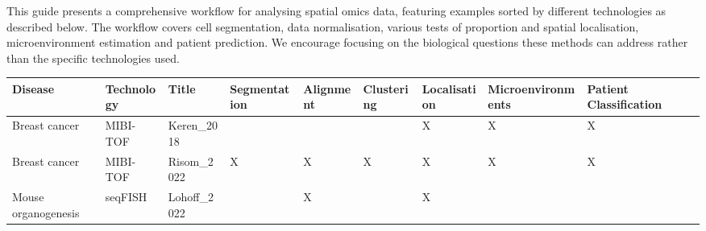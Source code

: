 \documentclass[
  letterpaper,
  DIV=11,
  numbers=noendperiod]{scrreprt}
\begin{document}
This guide presents a comprehensive workflow for analysing spatial omics
data, featuring examples sorted by different technologies as described
below. The workflow covers cell segmentation, data normalisation,
various tests of proportion and spatial localisation, microenvironment
estimation and patient prediction. We encourage focusing on the
biological questions these methods can address rather than the specific
technologies used.

\begin{longtable}[]{@{}
  >{\centering\arraybackslash}p{}
  >{\centering\arraybackslash}p{}
  >{\centering\arraybackslash}p{}
  >{\centering\arraybackslash}p{}
  >{\centering\arraybackslash}p{}
  >{\centering\arraybackslash}p{}
  >{\centering\arraybackslash}p{}
  >{\centering\arraybackslash}p{}
  >{\centering\arraybackslash}p{}
  >{\centering\arraybackslash}p{}@{}}
\toprule\noalign{}
\begin{minipage}[b]{\linewidth}\centering
Disease
\end{minipage} & \begin{minipage}[b]{\linewidth}\centering
Technology
\end{minipage} & \begin{minipage}[b]{\linewidth}\centering
Title
\end{minipage} & \begin{minipage}[b]{\linewidth}\centering
Segmentation
\end{minipage} & \begin{minipage}[b]{\linewidth}\centering
Alignment
\end{minipage} & \begin{minipage}[b]{\linewidth}\centering
Clustering
\end{minipage} & \begin{minipage}[b]{\linewidth}\centering
Localisation
\end{minipage} & \begin{minipage}[b]{\linewidth}\centering
Microenvironments
\end{minipage} & \begin{minipage}[b]{\linewidth}\centering
Patient Classification
\end{minipage} & \begin{minipage}[b]{\linewidth}\centering
\end{minipage} \\
\midrule\noalign{}
\endhead
\bottomrule\noalign{}
\endlastfoot
Breast cancer & MIBI-TOF & Keren\_2018 & & & & X & X & X & \\
Breast cancer & MIBI-TOF & Risom\_2022 & X & X & X & X & X & X & \\
Mouse organogenesis & seqFISH & Lohoff\_2022 & & X & & X & & & \\
\end{longtable}
\end{document}
